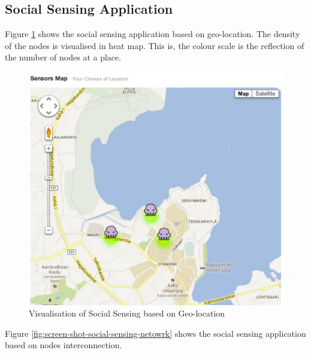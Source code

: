 \subsection{Social Sensing Application}

Figure \ref{fig:screen-shot-social-sensing-map} shows the social sensing application based on geo-location. The density of the nodes is visualised in heat map. This is, the colour scale is the reflection of the number of nodes at a place.

\begin{figure}[ht]
  \begin{center}
    \includegraphics[width=1\textwidth]{images/screen-shot-social-sensing-map.pdf}
    \caption{Visualisation of Social Sensing based on Geo-location}
    \label{fig:screen-shot-social-sensing-map}
  \end{center}
\end{figure}

Figure \ref{fig:screen-shot-social-sensing-netowrk} shows the social sensing application based on nodes interconnection.

